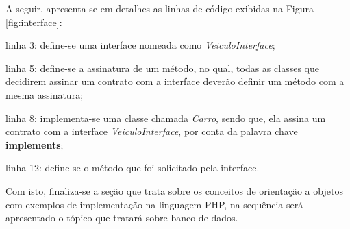 A seguir, apresenta-se em detalhes as linhas de código exibidas na Figura
\ref{fig:interface}:

\begin{alineas}
    \item linha 3: define-se uma interface nomeada como
    \textit{VeiculoInterface};
    \item linha 5: define-se a assinatura de um método, no qual, todas as
    classes que decidirem assinar um contrato com a interface deverão definir um
    método com a mesma assinatura;
    \item linha 8: implementa-se uma classe chamada \textit{Carro}, sendo que,
    ela assina um contrato com a interface \textit{VeiculoInterface}, por conta
    da palavra chave \textbf{implements};
    \item linha 12: define-se o método que foi solicitado pela interface.
\end{alineas}

Com isto, finaliza-se a seção que trata sobre os conceitos de orientação a
objetos com exemplos de implementação na linguagem \acs{PHP}, na sequência será
apresentado o tópico que tratará sobre banco de dados.
